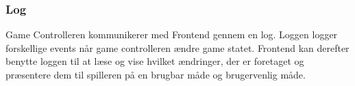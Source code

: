 \subsubsection{Log}
Game Controlleren kommunikerer med Frontend gennem en log. Loggen logger forskellige
events når game controlleren ændre game statet. Frontend kan derefter benytte loggen
til at læse og vise hvilket ændringer, der er foretaget og præsentere dem til spilleren
på en brugbar måde og brugervenlig måde.

\newpage
